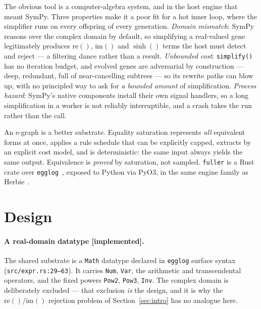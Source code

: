 \documentclass[sigconf]{acmart}
\begin{document}
The obvious tool is a computer-algebra system, and in the host engine that meant
SymPy. Three properties make it a poor fit for a hot inner loop, where the
simplifier runs on every offspring of every generation. \emph{Domain mismatch}:
SymPy reasons over the complex domain by default, so simplifying a real-valued
gene legitimately produces $\mathrm{re}()$, $\mathrm{im}()$ and $\sinh()$ terms
the host must detect and reject --- a filtering dance rather than a result.
\emph{Unbounded cost}: \texttt{simplify()} has no iteration budget, and evolved
genes are adversarial by construction --- deep, redundant, full of near-cancelling
subtrees --- so its rewrite paths can blow up, with no principled way to ask for
\emph{a bounded amount} of simplification. \emph{Process hazard}: SymPy's native
components install their own signal handlers, so a long simplification in a
worker is not reliably interruptible, and a crash takes the run rather than the
call.

An e-graph is a better substrate. Equality saturation represents \emph{all}
equivalent forms at once, applies a rule schedule that can be explicitly capped,
extracts by an explicit cost model, and is deterministic: the same input always
yields the same output. Equivalence is \emph{proved} by saturation, not sampled.
\texttt{fuller} is a Rust crate over \texttt{egglog}~\cite{egglog}, exposed to
Python via PyO3, in the same engine family as Herbie~\cite{herbie}.

\section{Design}
\label{sec:design}

\paragraph{A real-domain datatype [implemented].} The shared substrate is a
\texttt{Math} datatype declared in \texttt{egglog} surface syntax
(\texttt{src/expr.rs:29--63}). It carries \texttt{Num}, \texttt{Var}, the
arithmetic and transcendental operators, and the fixed powers \texttt{Pow2},
\texttt{Pow3}, \texttt{Inv}. The complex domain is deliberately excluded --- that
exclusion \emph{is} the design, and it is why the $\mathrm{re}()/\mathrm{im}()$
rejection problem of Section~\ref{sec:intro} has no analogue here.
\end{document}
